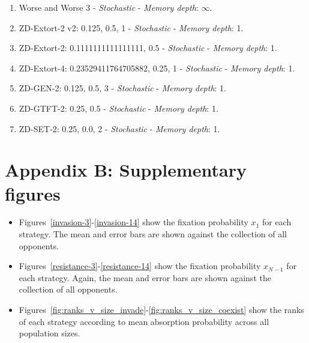 \documentclass[10pt,letterpaper]{article}
\begin{document}
\begin{enumerate}
\item Worse and Worse 3 - \textit{Stochastic} - \textit{Memory depth}: \(\infty\). \cite{Prison1998}
\item ZD-Extort-2 v2: 0.125, 0.5, 1 - \textit{Stochastic} - \textit{Memory depth}: 1. \cite{Kuhn2017}
\item ZD-Extort-2: 0.1111111111111111, 0.5 - \textit{Stochastic} - \textit{Memory depth}: 1. \cite{Stewart2012}
\item ZD-Extort-4: 0.23529411764705882, 0.25, 1 - \textit{Stochastic} - \textit{Memory depth}: 1. \cite{axelrodproject}
\item ZD-GEN-2: 0.125, 0.5, 3 - \textit{Stochastic} - \textit{Memory depth}: 1. \cite{Kuhn2017}
\item ZD-GTFT-2: 0.25, 0.5 - \textit{Stochastic} - \textit{Memory depth}: 1. \cite{Stewart2012}
\item ZD-SET-2: 0.25, 0.0, 2 - \textit{Stochastic} - \textit{Memory depth}: 1. \cite{Kuhn2017}
\end{enumerate}

\section{Appendix B: Supplementary figures}

\begin{itemize}
    \item Figures~\ref{invasion-3}-\ref{invasion-14} show the fixation probability \(x_1\)
for each strategy. The mean and error bars are shown against the collection of
all opponents.

    \item Figures~\ref{resistance-3}-\ref{resistance-14} show the fixation probability
\(x_{N-1}\) for each strategy. Again, the mean and error bars are shown against
the collection of all opponents.

    \item Figures~\ref{fig:ranks_v_size_invade}-\ref{fig:ranks_v_size_coexist} show the
ranks of each strategy according to mean absorption probability across all
population sizes.
\end{itemize}
\end{document}
